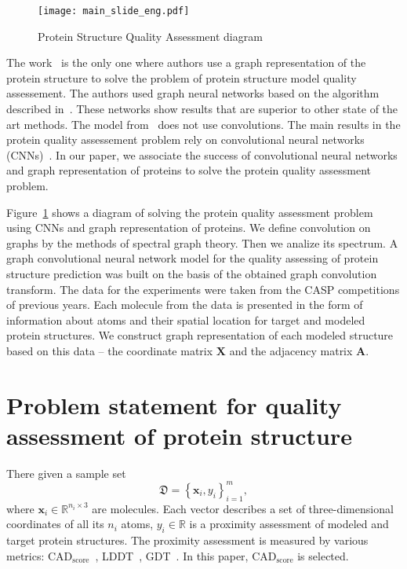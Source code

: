\documentclass[12pt,twosides]{extarticle}
\begin{document}
\begin{figure}[t]
	\centering
	\texttt{[image: main\_slide\_eng.pdf]}
	\caption{Protein Structure Quality Assessment diagram}
	\label{fig:experiment}
\end{figure}
The work~\cite{Baldassarre2019GraphQAPM} is the only one where authors use a graph representation of the protein structure to solve the problem of protein structure model quality assessement. The authors used graph neural networks based on the algorithm described in~\cite{Battaglia2018RelationalIB}. These networks show results that are superior to other state of the art methods. The model from~\cite{Baldassarre2019GraphQAPM} does not use convolutions. The main results in the protein quality assessement problem rely on convolutional neural networks (CNNs)~\cite{10.1093/bioinformatics/btz122}. In our paper, we associate the success of convolutional neural networks and graph representation of proteins to solve the protein quality assessment problem.

Figure~\ref{fig:experiment} shows a diagram of solving the protein quality assessment problem using CNNs and graph representation of proteins. We define convolution on graphs by the methods of spectral graph theory. Then we analize its spectrum. A graph convolutional neural network model for the quality assessing of protein structure prediction was built on the basis of the obtained graph convolution transform. The data for the experiments were taken from the CASP competitions of previous years. Each molecule from the data is presented in the form of information about atoms and their spatial location for target and modeled protein structures. We construct graph representation of each modeled structure based on this data -- the coordinate matrix $ \mathbf{X} $ and the adjacency matrix $\mathbf{A}$.


\section{Problem statement for quality assessment of protein structure}

There given a sample set $$\mathfrak{D} = \left\{\mathbf{x}_i, {y}_i\right\}_{i=1}^m,$$ where $\mathbf{x}_i\in \mathbb{R}^{n_i\times 3}$ are molecules. Each vector describes a set of three-dimensional coordinates of all its $n_i$ atoms, ${y}_i \in \mathbb{R}$ is a proximity assessment of modeled and target protein structures. The proximity assessment is measured by various metrics: $\text{CAD}_\text{score}$~\cite{Olechnovic2013CADscoreAN}, LDDT~\cite{Mariani2013lDDTAL}, GDT~\cite{GDT}. In this paper, $\text{CAD}_\text{score}$ is selected. 
\end{document}
